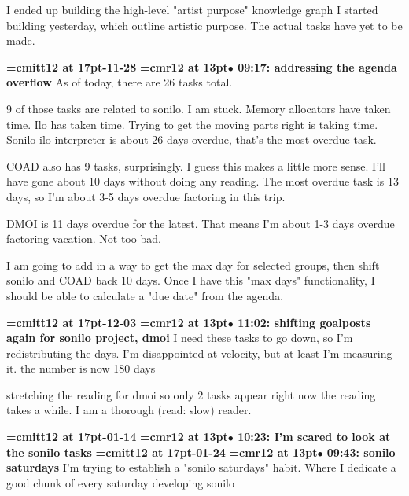 I ended up building the high-level "artist purpose" knowledge graph I started building yesterday, which outline artistic purpose. The actual tasks have yet to be made.
\par

{\medskip\noindent\bf\font\titlefont=cmitt12 at 17pt-11-28}\medskip
{\smallskip\noindent\bf\font\titlefont=cmr12 at 13pt\titlefont $\bullet$ 09:17: addressing the agenda overflow}\smallskip
As of today, there are 26 tasks total.
\par

9 of those tasks are related to sonilo. I am stuck. Memory allocators have taken time. Ilo has taken time. Trying to get the moving parts right is taking time. Sonilo ilo interpreter is about 26 days overdue, that's the most overdue task.
\par

COAD also has 9 tasks, surprisingly. I guess this makes a little more sense. I'll have gone about 10 days without doing any reading. The most overdue task is 13 days, so I'm about 3-5 days overdue factoring in this trip.
\par

DMOI is 11 days overdue for the latest. That means I'm about 1-3 days overdue factoring vacation. Not too bad.
\par

I am going to add in a way to get the max day for selected groups, then shift sonilo and COAD back 10 days. Once I have this "max days" functionality, I should be able to calculate a "due date" from the agenda.
\par

{\medskip\noindent\bf\font\titlefont=cmitt12 at 17pt-12-03}\medskip
{\smallskip\noindent\bf\font\titlefont=cmr12 at 13pt\titlefont $\bullet$ 11:02: shifting goalposts again for sonilo project, dmoi}\smallskip
I need these tasks to go down, so I'm redistributing the days. I'm disappointed at velocity, but at least I'm measuring it. the number is now 180 days
\par

stretching the reading for dmoi so only 2 tasks appear right now the reading takes a while. I am a thorough (read: slow) reader.
\par

{\medskip\noindent\bf\font\titlefont=cmitt12 at 17pt-01-14}\medskip
{\smallskip\noindent\bf\font\titlefont=cmr12 at 13pt\titlefont $\bullet$ 10:23: I'm scared to look at the sonilo tasks}\smallskip
{\medskip\noindent\bf\font\titlefont=cmitt12 at 17pt-01-24}\medskip
{\smallskip\noindent\bf\font\titlefont=cmr12 at 13pt\titlefont $\bullet$ 09:43: sonilo saturdays}\smallskip
I'm trying to establish a "sonilo saturdays" habit. Where I dedicate a good chunk of every saturday developing sonilo
\par


